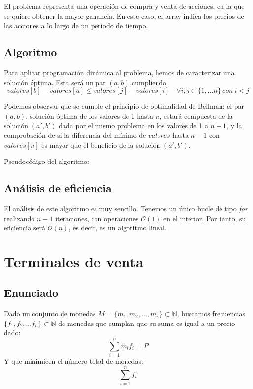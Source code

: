\documentclass[a4paper, 11pt]{article} %
\begin{document}
      El problema representa una operación de compra y venta de acciones, en la que se quiere obtener la mayor ganancia. En este caso, el array indica los precios de las acciones a lo largo de un período de tiempo.
      
	\subsection{Algoritmo}
		Para aplicar programación dinámica al problema, hemos de caracterizar una solución óptima. Esta será un par $(a,b)$ cumpliendo
		$$ valores[b]-valores[a] \le valores[j]-valores[i]
		\quad \forall i,j \in \{1,\dots n\}\ con\ i<j $$
		
		Podemos observar que se cumple el principio de optimalidad de Bellman: el par $(a,b)$, solución óptima de los valores de 1 hasta $n$, estará compuesta de la solución $(a',b')$ dada por el mismo problema en los valores de 1 a $n-1$, y la comprobación de si la diferencia del mínimo de $valores$ hasta $n-1$ con $valores[n]$ es mayor que el beneficio de la solución $(a', b')$.
		
		Pseudocódigo del algoritmo:
		
		\small
		\texttt{}
		\normalsize
		
	\subsection{Análisis de eficiencia}
		El análisis de este algoritmo es muy sencillo. Tenemos un único bucle de tipo \textit{for} realizando $n-1$ iteraciones, con operaciones $\mathcal{O}(1)$ en el interior. Por tanto, su eficiencia será $\mathcal{O}(n)$, es decir, es un algoritmo lineal.

\section{Terminales de venta}
  \subsection{Enunciado}
    Dado un conjunto de monedas $M = \{m_1, m_2, \dots, m_n\} \subset \mathbb{N}$, buscamos frecuencias $\{f_1,f_2,\dots f_n\} \subset \mathbb{N}$ de 
    monedas que cumplan que su suma es igual a un precio dado:
    \begin{equation}
     \sum_{i=1}^n m_i f_i = P
    \end{equation}
    Y que minimicen el número total de monedas:
    \begin{equation}
     \sum_{i=1}^n f_i
    \end{equation}
    
\end{document}
